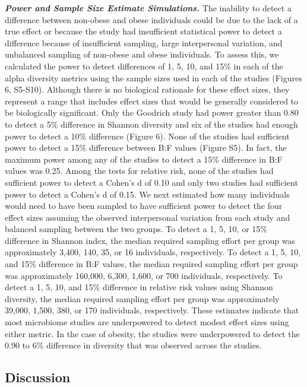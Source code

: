 \documentclass[12pt,]{article}
\begin{document}
\textbf{\emph{Power and Sample Size Estimate Simulations.}} The
inability to detect a difference between non-obese and obese individuals
could be due to the lack of a true effect or because the study had
insufficient statistical power to detect a difference because of
insufficient sampling, large interpersonal variation, and unbalanced
sampling of non-obese and obese individuals. To assess this, we
calculated the power to detect differences of 1, 5, 10, and 15\% in each
of the alpha diversity metrics using the sample sizes used in each of
the studies (Figures 6, S5-S10). Although there is no biological
rationale for these effect sizes, they represent a range that includes
effect sizes that would be generally considered to be biologically
significant. Only the Goodrich study had power greater than 0.80 to
detect a 5\% difference in Shannon diversity and six of the studies had
enough power to detect a 10\% difference (Figure 6). None of the studies
had sufficient power to detect a 15\% difference between B:F values
(Figure S5). In fact, the maximum power among any of the studies to
detect a 15\% difference in B:F values was 0.25. Among the tests for
relative risk, none of the studies had sufficient power to detect a
Cohen's d of 0.10 and only two studies had sufficient power to detect a
Cohen's d of 0.15. We next estimated how many individuals would need to
have been sampled to have sufficient power to detect the four effect
sizes assuming the observed interpersonal variation from each study and
balanced sampling between the two groups. To detect a 1, 5, 10, or 15\%
difference in Shannon index, the median required sampling effort per
group was approximately 3,400, 140, 35, or 16 individuals, respectively.
To detect a 1, 5, 10, and 15\% difference in B:F values, the median
required sampling effort per group was approximately 160,000, 6,300,
1,600, or 700 individuals, respectively. To detect a 1, 5, 10, and 15\%
difference in relative risk values using Shannon diversity, the median
required sampling effort per group was approximately 39,000, 1,500, 380,
or 170 individuals, respectively. These estimates indicate that most
microbiome studies are underpowered to detect modest effect sizes using
either metric. In the case of obesity, the studies were underpowered to
detect the 0.90 to 6\% difference in diversity that was observed across
the studies.

\subsection{Discussion}\label{discussion}
\end{document}
